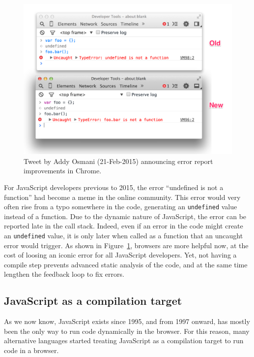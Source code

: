 \begin{figure}[ht]
	\centering
	\includegraphics[width=1.0\linewidth]{assets/img/undefined-improved.png}
	\caption{Tweet by Addy Osmani (21-Feb-2015) announcing error report improvements in Chrome.}%
	\label{fig:undefined-improved}
\end{figure}

For JavaScript developers previous to 2015,
the error ``undefined is not a function'' had become a meme in the online community.
This error would very often rise from a typo somewhere in the code,
generating an \verb|undefined| value instead of a function.
Due to the dynamic nature of JavaScript, the error can be reported late in the call stack.
Indeed, even if an error in the code might create an \verb|undefined| value,
it is only later when called as a function that an uncaught error would trigger.
As shown in Figure~\ref{fig:undefined-improved}, browsers are more helpful now,
at the cost of loosing an iconic error for all JavaScript developers.
Yet, not having a compile step prevents advanced static analysis of the code,
and at the same time lengthen the feedback loop to fix errors.


\subsection{JavaScript as a compilation target}%
\label{sub:javascript_as_a_compilation_target}

As we now know, JavaScript exists since 1995, and from 1997 onward,
has mostly been the only way to run code dynamically in the browser.
For this reason, many alternative languages started treating JavaScript
as a compilation target to run code in a browser.

